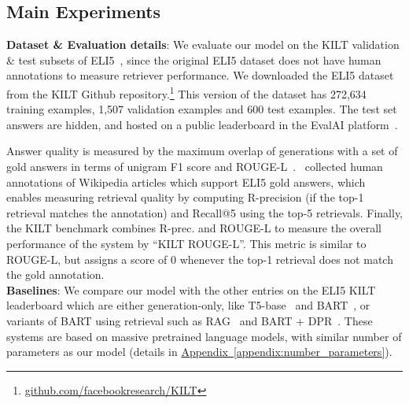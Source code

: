 \documentclass[11pt]{article}
\newcommand{\namedref}[2]{\hyperref[#2]{#1~\ref*{#2}}}
\newcommand{\appendixref}[1]{\namedref{Appendix}{#1}}
\begin{document}
 \subsection{Main Experiments}
\label{sec:experiments}


\noindent \textbf{Dataset \& Evaluation details}: We evaluate our model on the KILT validation \& test subsets of ELI5~\citep{petroni2020kilt}, since the original ELI5 dataset does not have human annotations to measure retriever performance. We downloaded the ELI5 dataset~\citep{fan-etal-2019-eli5} from the KILT Github repository.\footnote{\url{github.com/facebookresearch/KILT}} This version of the dataset has 272,634 training examples, 1,507 validation examples and 600 test examples. The test set answers are hidden, and hosted on a public leaderboard in the EvalAI platform~\citep{EvalAI}.

Answer quality is measured by the maximum overlap of generations with a set of gold answers in terms of unigram F1 score and ROUGE-L~\citep{lin-2004-rouge}.~\citet{petroni2020kilt} collected human annotations of Wikipedia articles which support 
ELI5 gold answers, which enables measuring retrieval quality by computing R-precision (if
the top-1 retrieval matches the annotation) and Recall@5 using the top-5 
retrievals. Finally, the KILT benchmark combines R-prec. and 
ROUGE-L to measure the overall performance of the system by ``KILT ROUGE-L''. This metric is similar to ROUGE-L, but assigns a score of 0 whenever the top-1 retrieval does not match the gold annotation.\\


\noindent \textbf{Baselines}: We compare our model with the other entries on the ELI5 KILT leaderboard which are either generation-only, like T5-base~\citep{raffel2019exploring} and BART~\citep{lewis2019bart}, or variants of BART using retrieval such as RAG~\citep{lewis2020retrieval} and BART + DPR~\citep{petroni2020kilt}. These systems are based on massive pretrained language models, with similar number of parameters as our model (details in \appendixref{appendix:number_parameters}).\\
\end{document}
